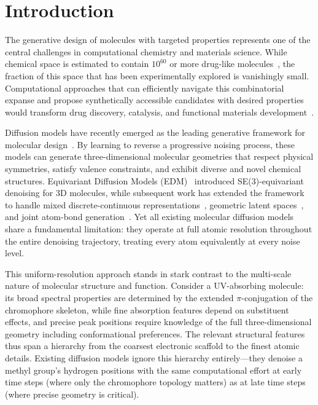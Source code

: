 \documentclass[11pt]{article}
\begin{document}
\section*{Introduction}

The generative design of molecules with targeted properties represents one of the central challenges in computational chemistry and materials science. While chemical space is estimated to contain $10^{60}$ or more drug-like molecules~\cite{bilodeau2022generative}, the fraction of this space that has been experimentally explored is vanishingly small. Computational approaches that can efficiently navigate this combinatorial expanse and propose synthetically accessible candidates with desired properties would transform drug discovery, catalysis, and functional materials development~\cite{gomez2018automatic}.

Diffusion models have recently emerged as the leading generative framework for molecular design~\cite{hoogeboom2022edm, xu2023geodiff, vignac2023midi, morehead2024gcdm}. By learning to reverse a progressive noising process, these models can generate three-dimensional molecular geometries that respect physical symmetries, satisfy valence constraints, and exhibit diverse and novel chemical structures. Equivariant Diffusion Models (EDM)~\cite{hoogeboom2022edm} introduced SE(3)-equivariant denoising for 3D molecules, while subsequent work has extended the framework to handle mixed discrete-continuous representations~\cite{vignac2023midi}, geometric latent spaces~\cite{xu2023geoldm}, and joint atom-bond generation~\cite{peng2023moldiff}. Yet all existing molecular diffusion models share a fundamental limitation: they operate at full atomic resolution throughout the entire denoising trajectory, treating every atom equivalently at every noise level.

This uniform-resolution approach stands in stark contrast to the multi-scale nature of molecular structure and function. Consider a UV-absorbing molecule: its broad spectral properties are determined by the extended $\pi$-conjugation of the chromophore skeleton, while fine absorption features depend on substituent effects, and precise peak positions require knowledge of the full three-dimensional geometry including conformational preferences. The relevant structural features thus span a hierarchy from the coarsest electronic scaffold to the finest atomic details. Existing diffusion models ignore this hierarchy entirely---they denoise a methyl group's hydrogen positions with the same computational effort at early time steps (where only the chromophore topology matters) as at late time steps (where precise geometry is critical).
\end{document}
